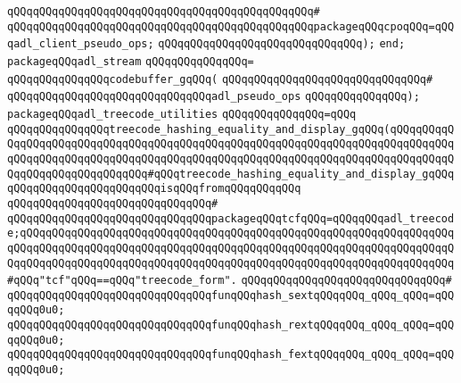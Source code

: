 \verb|qQQqqQQqqQQqqQQqqQQqqQQqqQQqqQQqqQQqqQQqqQQqqQQq#|\newline
\verb|qQQqqQQqqQQqqQQqqQQqqQQqqQQqqQQqqQQqqQQqqQQqqQQqpackageqQQqcpoqQQq=qQQqadl_client_pseudo_ops;|\newline
\verb|qQQqqQQqqQQqqQQqqQQqqQQqqQQqqQQq);|\newline
\verb|end;|\newline
\newline
\newline
\verb|packageqQQqadl_stream|\newline
\verb|qQQqqQQqqQQqqQQq=|\newline
\verb|qQQqqQQqqQQqqQQqcodebuffer_gqQQq(|\newline
\verb|qQQqqQQqqQQqqQQqqQQqqQQqqQQqqQQq#|\newline
\verb|qQQqqQQqqQQqqQQqqQQqqQQqqQQqqQQqadl_pseudo_ops|\newline
\verb|qQQqqQQqqQQqqQQq);|\newline
\newline
\verb|packageqQQqadl_treecode_utilities|\newline
\verb|qQQqqQQqqQQqqQQq=qQQq|\newline
\verb|qQQqqQQqqQQqqQQqtreecode_hashing_equality_and_display_gqQQq(qQQqqQQqqQQqqQQqqQQqqQQqqQQqqQQqqQQqqQQqqQQqqQQqqQQqqQQqqQQqqQQqqQQqqQQqqQQqqQQqqQQqqQQqqQQqqQQqqQQqqQQqqQQqqQQqqQQqqQQqqQQqqQQqqQQqqQQqqQQqqQQqqQQqqQQqqQQqqQQqqQQqqQQqqQQq#qQQqtreecode_hashing_equality_and_display_gqQQqqQQqqQQqqQQqqQQqqQQqqQQqisqQQqfromqQQqqQQqqQQq|\newline
\verb|qQQqqQQqqQQqqQQqqQQqqQQqqQQqqQQq#|\newline
\verb|qQQqqQQqqQQqqQQqqQQqqQQqqQQqqQQqpackageqQQqtcfqQQq=qQQqqQQqadl_treecode;qQQqqQQqqQQqqQQqqQQqqQQqqQQqqQQqqQQqqQQqqQQqqQQqqQQqqQQqqQQqqQQqqQQqqQQqqQQqqQQqqQQqqQQqqQQqqQQqqQQqqQQqqQQqqQQqqQQqqQQqqQQqqQQqqQQqqQQqqQQqqQQqqQQqqQQqqQQqqQQqqQQqqQQqqQQqqQQqqQQqqQQqqQQqqQQqqQQqqQQqqQQqqQQq#qQQq"tcf"qQQq==qQQq"treecode_form".|\newline
\verb|qQQqqQQqqQQqqQQqqQQqqQQqqQQqqQQq#|\newline
\verb|qQQqqQQqqQQqqQQqqQQqqQQqqQQqqQQqfunqQQqhash_sextqQQqqQQq_qQQq_qQQq=qQQqqQQq0u0;|\newline
\verb|qQQqqQQqqQQqqQQqqQQqqQQqqQQqqQQqfunqQQqhash_rextqQQqqQQq_qQQq_qQQq=qQQqqQQq0u0;|\newline
\verb|qQQqqQQqqQQqqQQqqQQqqQQqqQQqqQQqfunqQQqhash_fextqQQqqQQq_qQQq_qQQq=qQQqqQQq0u0;|\newline
